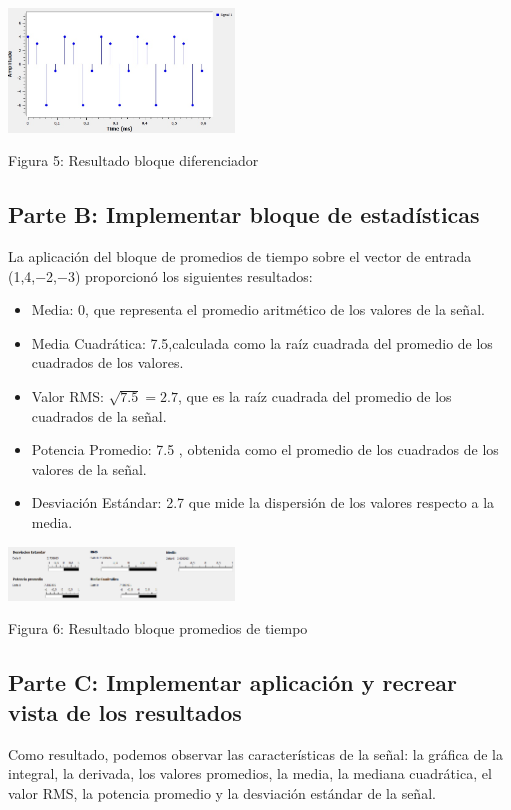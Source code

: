 \documentclass{journal}[IEEEtran, twocolumn]             %
\begin{document}
\begin{multicols}{2}
    \begin{center}
    \includegraphics[width=0.45\textwidth]{figs/F3.png}
    \caption{Figura 5: Resultado bloque diferenciador}
    \end{center}
    
\subsection{Parte B: Implementar bloque de estadísticas}

    La aplicación del bloque de promedios de tiempo sobre el vector de entrada (1,4,−2,−3) proporcionó los siguientes resultados:
    \begin{itemize}
        \item Media: 0, que representa el promedio aritmético de los valores de la señal.
        \item Media Cuadrática: 7.5,calculada como la raíz cuadrada del promedio de los cuadrados de los valores.
       \item Valor RMS: \(\sqrt{7.5} = 2.7 \), que es la raíz cuadrada del promedio de los cuadrados de la señal.
        \item Potencia Promedio: 7.5 , obtenida como el promedio de los cuadrados de los valores de la señal.
        \item Desviación Estándar: 2.7 que mide la dispersión de los valores respecto a la media.
         
        \end{itemize}
        
        \begin{center}
        \includegraphics[width=0.45\textwidth]{figs/F5.png}
        \caption{Figura 6: Resultado bloque promedios de tiempo}
        \end{center}
        
\subsection{Parte C: Implementar aplicación y recrear vista de los resultados}
Como resultado, podemos observar las características de la señal: la gráfica de la integral, la derivada, los valores promedios, la media, la mediana cuadrática, el valor RMS, la potencia promedio y la desviación estándar de la señal.


\end{multicols}
\end{document}
